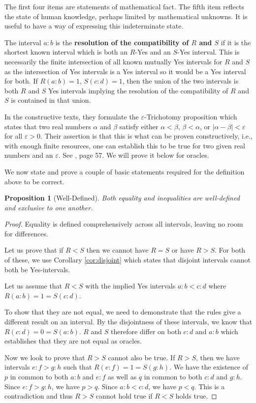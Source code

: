 \documentclass[12pt]{article}
\newtheorem{proposition}{Proposition}[subsection]
\begin{document}
The first four items are statements of mathematical fact. The fifth item reflects the state of human knowledge, perhaps limited by mathematical unknowns. It is useful to have a way of expressing this indeterminate state. 

The interval $a:b$ is the \textbf{resolution of the compatibility of $R$ and $S$} if it is the shortest known interval which is both an $R$-Yes and an $S$-Yes interval. This is necessarily the finite intersection of all known mutually Yes intervals for $R$ and $S$ as the intersection of Yes intervals is a Yes interval so it would be a Yes interval for both. If $R(a:b) = 1$, $S(c:d) = 1$, then the union of the two intervals is both $R$ and $S$ Yes intervals implying the resolution of the compatibility of $R$ and $S$ is contained in that union.

In the constructive texts, they formulate the $\varepsilon$-Trichotomy proposition which states that two real numbers $\alpha$ and $\beta$ satisfy either $\alpha < \beta$, $\beta < \alpha$, or $|\alpha - \beta| < \varepsilon$ for all $\varepsilon > 0$. Their assertion is that this is what can be proven constructively, i.e., with enough finite resources, one can establish this to be true for two given real numbers and an $\varepsilon$. See \cite{bridger}, page 57. We will prove it below for oracles.  

We now state and prove a couple of basic statements required for the definition above to be correct. 

\begin{proposition}[Well-Defined]\label{pr:wd}
Both equality and inequalities are well-defined and exclusive to one another.  
\end{proposition}

\begin{proof}
Equality is defined comprehensively across all intervals, leaving no room for differences. 

Let us prove that if $R < S$ then we cannot have $R=S$ or have $R > S$. For both of these, we use Corollary \ref{cor:disjoint} which states that disjoint intervals cannot both be Yes-intervals. 

Let us assume that $R<S$ with the implied Yes intervals $a:b < c:d$ where $R(a:b)=1 =S(c:d)$.

To show that they are not equal, we need to demonstrate that the rules give a different result on an interval. By the disjointness of these intervals, we know that $R(c:d) = 0 = S(a:b)$. $R$ and $S$ therefore differ on both $c:d$ and $a:b$ which establishes that they are not equal as oracles.  

Now we look to prove that $R>S$ cannot also be true. If $R > S$, then we have intervals $e:f > g:h$ such that $R(e:f) = 1 = S(g:h)$. We have the existence of $p$ in common to both $a:b$ and $e:f$ as well as $q$ in common to both $c:d$ and $g:h$. Since $e:f > g:h$, we have $p > q$. Since $a:b < c:d$, we have $p < q$. This is a contradiction and thus $R>S$ cannot hold true if $R<S$ holds true.
\end{proof}
\end{document}
